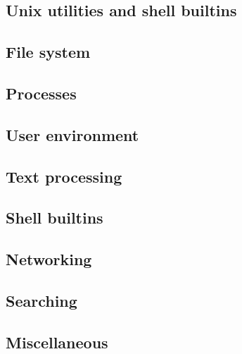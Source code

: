 \documentclass[a4paper, twoside, 8pt]{extarticle}
\begin{document}
\renewcommand{\footrulewidth}{0.4pt}

\begin{multicols}{3}
\section{Unix utilities and shell builtins}

\subsection{File system}


\subsection{Processes}


\subsection{User environment}


\subsection{Text processing}


\subsection{Shell builtins}


\subsection{Networking}


\subsection{Searching}



\subsection{Miscellaneous}


\end{multicols}
\end{document}
